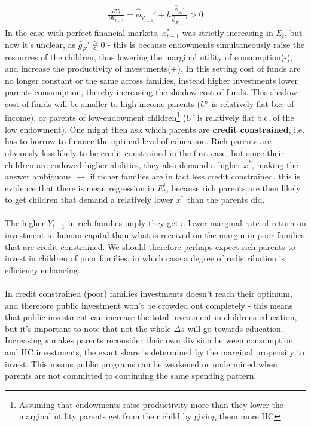 \documentclass[12pt, a4paper]{article}
\begin{document}
\begin{multicols}{2}
\begin{align*}
\frac{\partial Y_t}{\partial Y_{t-1}} = \hat{\phi}_{Y_{t-1}}' + h \frac{\hat{\phi}_{E_{t}}'}{\hat{\phi}_{E_{t-1}}'}>0
\end{align*}
In the case with perfect financial markets, $x_{t-1}^*$ was strictly increasing in $E_t$, but now it's unclear, as $\hat{g}_{E}'\gtreqless 0$ - this is because endowments simultaneously raise the resources of the children, thus lowering the marginal utility of consumption(-), and increase the productivity of investments(+). In this setting cost of funds are no longer constant or the same across families, instead higher investments lower parents consumption, thereby increasing the shadow cost of funds. This shadow cost of funds will be smaller to high income parents ($U'$ is relatively flat b.c. of income), or parents of low-endowment children\footnote{Assuming that endowments raise productivity more than they lower the marginal utility parents get from their child by giving them more HC} ($U'$ is relatively flat b.c. of the low endowment). One might then ask which parents are \textbf{credit constrained}, i.e. has to borrow to finance the optimal level of education. Rich parents are obviously less likely to be credit constrained in the first case, but since their children are endowed higher abilities, they also demand a higher $x^*$, making the answer ambiguous $\rightarrow$ if richer families are in fact less credit constrained, this is evidence that there is mean regression in $E_t^i$, because rich parents are then likely to get children that demand a relatively lower $x^*$ than the parents did.
\\ \\
The higher $Y_{t-1}$ in rich families imply they get a lower marginal rate of return on investment in human capital than what is received on the margin in poor families that are credit constrained. We should therefore perhaps expect rich parents to invest in children of poor families, in which case a degree of redistribution is efficiency enhancing.
\\ \\
In credit constrained (poor) families investments doesn't reach their optimum, and therefore public investment won't be crowded out completely - this means that public investment can increase the total investment in childrens education, but it's important to note that not the whole $\Delta s$ will go towards education. Increasing $s$ makes parents reconsider their own division between consumption and HC investments, the exact share is determined by the marginal propensity to invest. This means public programs can be weakened or undermined when parents are not committed to continuing the same spending pattern.


\end{multicols}
\end{document}
